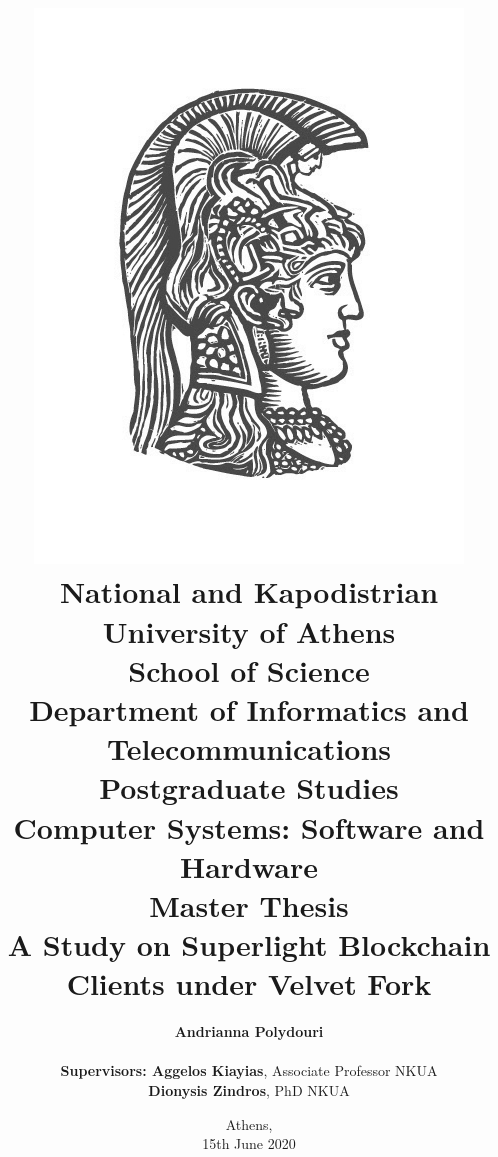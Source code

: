 \title{
    {\includegraphics[scale=0.8]{figures/logo_uoa.jpg}}\\
    {\large National and Kapodistrian University of Athens \\
    School of Science \\
    Department of Informatics and Telecommunications}\\
    \vspace{1cm}
    Postgraduate Studies \\
    Computer Systems: Software and Hardware\\
    \vspace{10mm}
    {Master Thesis}\\
    \vspace{3mm}
    {\textbf{\LARGE A Study on Superlight Blockchain Clients under Velvet Fork}}\\
    \vspace{1cm}
    }

\author{
    \textbf{Andrianna Polydouri} \\
    \vspace{1cm} \\
    \textbf{Supervisors: Aggelos Kiayias}, Associate Professor NKUA\\
    \hspace{0.30cm}
    \textbf{Dionysis Zindros}, PhD NKUA
    \vspace{2cm}
}

\date{Athens, \\ 15th June 2020}